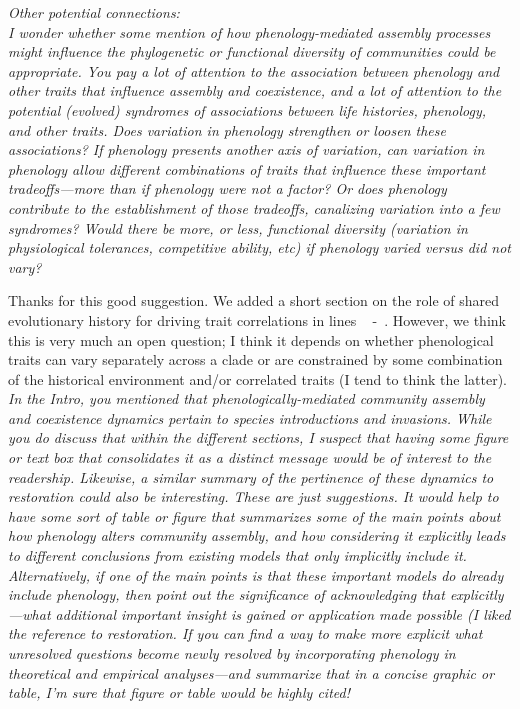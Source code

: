 \documentclass[11pt]{article}
\newcommand{\lr}[1]{~\lineref{#1}}
\begin{document}
\emph{Other potential connections:\\
I wonder whether some mention of how phenology-mediated assembly processes might influence the phylogenetic or functional diversity of communities could be appropriate. You pay a lot of attention to the association between phenology and other traits that influence assembly and coexistence, and a lot of attention to the potential (evolved) syndromes of associations between life histories, phenology, and other traits. Does variation in phenology strengthen or loosen these associations? If phenology presents another axis of variation, can variation in phenology allow different combinations of traits that influence these important tradeoffs—more than if phenology were not a factor? Or does phenology contribute to the establishment of those tradeoffs, canalizing variation into a few syndromes? Would there be more, or less, functional diversity (variation in physiological tolerances, competitive ability, etc) if phenology varied versus did not vary?}

Thanks for this good suggestion. We added a short section on the role of shared evolutionary history for driving trait correlations in lines \lr{phylo1} -\lr{phylo2}. However, we think this is very much an open question; I think it depends on whether phenological traits can vary separately across a clade or are constrained by some combination of the historical environment and/or correlated traits (I tend to think the latter).\\

\emph{In the Intro, you mentioned that phenologically-mediated community assembly and coexistence dynamics pertain to species introductions and invasions. While you do discuss that within the different sections, I suspect that having some figure or text box that consolidates it as a distinct message would be of interest to the readership. Likewise, a similar summary of the pertinence of these dynamics to restoration could also be interesting. These are just suggestions. It would help to have some sort of table or figure that summarizes some of the main points about how phenology alters community assembly, and how considering it explicitly leads to different conclusions from existing models that only implicitly include it. Alternatively, if one of the main points is that these important models do already include phenology, then point out the significance of acknowledging that explicitly—what additional important insight is gained or application made possible (I liked the reference to restoration. If you can find a way to make more explicit what unresolved questions become newly resolved by incorporating phenology in theoretical and empirical analyses—and summarize that in a concise graphic or table, I’m sure that figure or table would be highly cited!}\\
\end{document}
